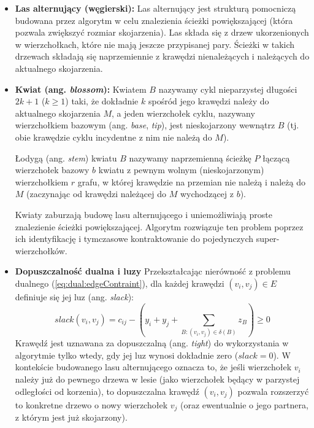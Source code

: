 \documentclass{article}
\theoremstyle{definition}
\theoremstyle{plain}
\theoremstyle{remark}
\begin{document}
\begin{itemize}
    \item \textbf{Las alternujący (węgierski):} Las alternujący jest strukturą pomocniczą budowana przez algorytm w celu znalezienia ścieżki powiększającej (która pozwala zwiększyć rozmiar skojarzenia). Las składa się z drzew ukorzenionych w wierzchołkach, które nie mają jeszcze przypisanej pary. Ścieżki w takich drzewach składają się naprzemiennie z krawędzi nienależących i należących do aktualnego skojarzenia.
    

    \item \textbf{Kwiat (ang. \textit{blossom}):} Kwiatem $B$ nazywamy cykl nieparzystej długości $2k + 1$ ($k \geq 1$) taki, że dokładnie $k$ spośród jego krawędzi należy do aktualnego skojarzenia $M$, a jeden wierzchołek cyklu, nazywany wierzchołkiem bazowym (ang. \textit{base}, \textit{tip}), jest nieskojarzony wewnątrz $B$ (tj. obie krawędzie cyklu incydentne z nim nie należą do $M$).

    Łodygą (ang. \textit{stem}) kwiatu $B$ nazywamy naprzemienną ścieżkę $P$ łączącą wierzchołek bazowy $b$ kwiatu z pewnym wolnym (nieskojarzonym) wierzchołkiem $r$ grafu, w której krawędzie na przemian nie należą i należą do $M$ (zaczynając od krawędzi należącej do $M$ wychodzącej z $b$).

    Kwiaty zaburzają budowę lasu alternującego i uniemożliwiają proste znalezienie ścieżki powiększającej. Algorytm rozwiązuje ten problem poprzez ich identyfikację i tymczasowe kontraktowanie do pojedynczych super-wierzchołków.
    

    \item \textbf{Dopuszczalność dualna i luzy}
    Przekształcając nierówność z problemu dualnego (\ref{eq:dual:edgeContraint}), dla każdej krawędzi $(v_i, v_j) \in E$ definiuje się jej luz (ang. \textit{slack}):
    \begin{equation}
        slack(v_i, v_j) = c_{ij} - \left(y_i + y_j + \sum_{B: (v_i, v_j) \in \delta(B)} z_B\right) \geq 0
    \end{equation}
    Krawędź jest uznawana za dopuszczalną (ang. \textit{tight}) do wykorzystania w algorytmie tylko wtedy, gdy jej luz wynosi dokładnie zero ($slack = 0$). W kontekście budowanego lasu alternującego oznacza to, że jeśli wierzchołek $v_i$ należy już do pewnego drzewa w lesie (jako wierzchołek będący w parzystej odległości od korzenia), to dopuszczalna krawędź $(v_i, v_j)$ pozwala rozszerzyć to konkretne drzewo o nowy wierzchołek $v_j$ (oraz ewentualnie o jego partnera, z którym jest już skojarzony).
\end{itemize}
\end{document}
